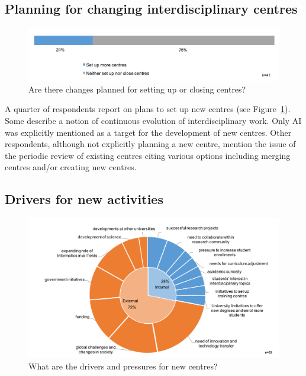 \subsection{Planning for changing interdisciplinary centres}

\begin{figure}[h]
\centering
\includegraphics[width = \linewidth]{charts/5f.png}
\caption{Are there changes planned for setting up or closing centres?}
\label{sect5:changes}
\end{figure}

A quarter of respondents report on plans to set up new centres (see Figure~\ref{sect5:changes}). Some describe a notion of continuous evolution of interdisciplinary work. Only AI was explicitly mentioned as a target for the development of new centres. Other respondents, although not explicitly planning a new centre, mention the issue of the periodic review of existing centres citing various options including merging centres and/or creating new centres.  

\subsection{Drivers for new activities}

\begin{figure}[h]
\centering
\includegraphics[width = \linewidth]{charts/5g.png}
\caption{What are the drivers and pressures for new centres?}
\label{sect5:drivers}
\end{figure}
                                                                                                                    
